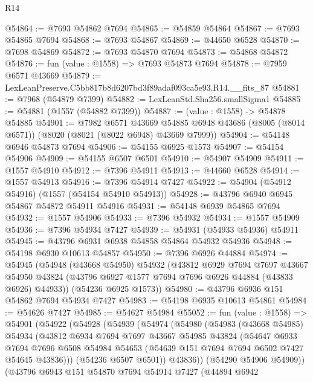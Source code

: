 \begin{lexlean}{R14}
\begin{coremodule}
@54864 := @7693 @54862 @7694
@54865 := @54859 @54864
@54867 := @7693 @54865 @7694
@54868 := @7693 @54867
@54869 := @44650 @6528
@54870 := @7698 @54869
@54872 := @7693 @54870 @7694
@54873 := @54868 @54872
@54876 := fun (value : @1558) => @7693 @54873 @7694
@54878 := @7959 @6571 @43669
@54879 := LexLeanPreserve.C5bb817b8d6207bd3f89adaf093ca5e93.R14.__fits_87
@54881 := @7968 (@54879 @7399)
@54882 := LexLeanStd.Sha256.smallSigma1
@54885 := @54881 (@1557 (@54882 @7399))
@54887 := (value : @1558) -> @54878 @54885
@54901 := @7982
    @6571
    @43669
    @54885
    @6948
    @43686
    (@8005 (@8014 @6571))
    (@8020 (@8021 (@8022 @6948) @43669 @7999))
@54904 := @54148 @6946 @54873 @7694
@54906 := @54155 @6925 @1573
@54907 := @54154 @54906
@54909 := @54155 @6507 @6501
@54910 := @54907 @54909
@54911 := @1557 @54910
@54912 := @7396 @54911
@54913 := @44660 @6528
@54914 := @1557 @54913
@54916 := @7396 @54914 @7427
@54922 := @54904 (@54912 @54916) (@1557 (@54154 @54910 @54913))
@54928 := @43796 @6940 @6945 @54867 @54872 @54911 @54916
@54931 := @54148 @6939 @54865 @7694
@54932 := @1557 @54906
@54933 := @7396 @54932
@54934 := @1557 @54909
@54936 := @7396 @54934 @7427
@54939 := @54931 (@54933 @54936) @54911
@54945 := @43796 @6931 @6938 @54858 @54864 @54932 @54936
@54948 := @54198 @6930 @10613 @54857
@54950 := @7396 @6926 @44884
@54974 := @54945
    (@54948
      (@43668 @54950)
      @54932
      (@43812
        @6929
        @7694
        @7697
        @43667
        @54950
        @43824
        (@43796 @6927 @1577 @7694 @7696 @6926 @44884 (@43833 @6926) @44933))
      (@54236 @6925 @1573))
@54980 := @43796 @6936 @151 @54862 @7694 @54934 @7427
@54983 := @54198 @6935 @10613 @54861
@54984 := @54626 @7427
@54985 := @54627 @54984
@55052 := fun (value : @1558) =>
  @54901
    (@54922
      (@54928
        (@54939
          (@54974
            (@54980
              (@54983
                (@43668 @54985)
                @54934
                (@43812
                  @6934
                  @7694
                  @7697
                  @43667
                  @54985
                  @43824
                  (@54647
                    @6933
                    @7694
                    @7696
                    @6508
                    @54984
                    @54653
                    (@54639 @151 @7694 @7694 @6502 @7427 @54645 @43836)))
                (@54236 @6507 @6501))
              @43836))
          (@54290 @54906 @54909))
        (@43796
          @6943
          @151
          @54870
          @7694
          @54914
          @7427
          (@44894
            @6942

\end{coremodule}
\end{lexlean}
